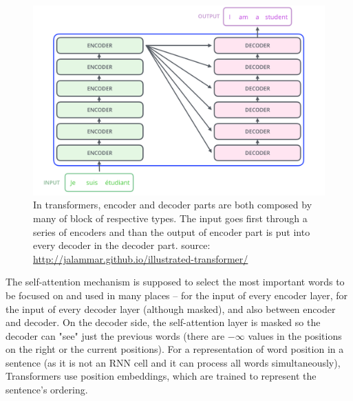 \begin{figure}[H]
\centering
\includegraphics[width=1\columnwidth]{../img/encoder_decoder_all}
\protect\caption[Encoder-decoder overall architecture]{ In transformers, encoder and decoder parts are both composed by many of block of respective types. The input goes first through a series of encoders and than the output of encoder part is put into every decoder in the decoder part. %
source: \url{http://jalammar.github.io/illustrated-transformer/}  }
\label{pic:enco_deco_all}
\end{figure}
The self-attention mechanism is supposed to select the most important words to be focused on and used in many places -- for the input of every encoder layer, for the input of every decoder layer (although masked), and also between encoder and decoder. On the decoder side, the self-attention layer is masked so the decoder can "see" just the previous words (there are $-\infty$ values in the positions on the right or the current positions). For a representation of word position in a sentence (as it is not an RNN cell and it can process all words simultaneously), Transformers use position embeddings, which are trained to represent the sentence's ordering.

